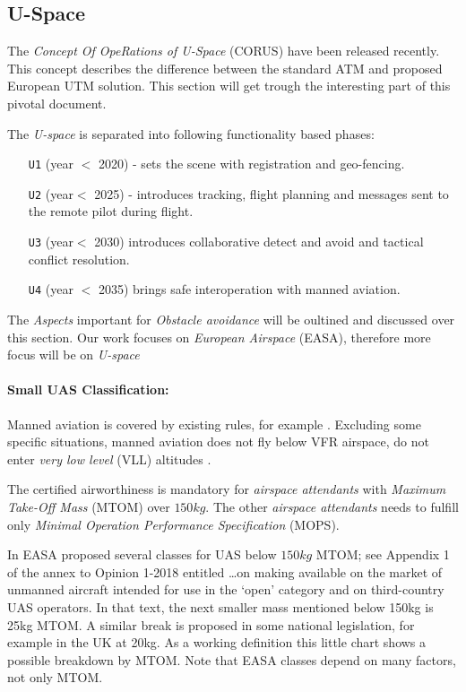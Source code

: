 \subsection{U-Space}\label{sec:USpace}

\noindent The \emph{Concept Of OpeRations of U-Space} (CORUS) \cite{corus2018} have been released recently. This concept describes the difference between the standard ATM and proposed European UTM solution. This section will get trough the interesting part of this pivotal document.

\noindent The \emph{U-space} is separated into following functionality based phases:
\begin{itemize}
    \item[\texttt{U1}] (year $<$ 2020) - sets the scene with registration and geo-fencing.
    
    \item[\texttt{U2}] (year$<$ 2025) - introduces tracking, flight planning and messages sent to the remote pilot during flight.
    
    \item[\texttt{U3}] (year$<$ 2030) introduces collaborative detect and avoid and tactical conflict resolution.
    
    \item[\texttt{U4}] (year $<$ 2035) brings safe interoperation with manned aviation.
\end{itemize}

The \emph{Aspects} important for \emph{Obstacle avoidance} will be oultined and discussed over this section. Our work focuses on \emph{European Airspace} (EASA), therefore more focus will be on \emph{U-space}

\paragraph{Small UAS Classification:} Manned aviation is covered by existing rules, for example \cite{icaoAnnex2,ec201208ref5}. Excluding some specific situations, manned aviation does not fly below VFR airspace, do not enter \emph{very low level} (VLL) altitudes \cite{ec200802ref4}. 

The certified airworthiness is mandatory for \emph{airspace attendants} with \emph{Maximum Take-Off Mass} (MTOM) over $150 kg$. The other \emph{airspace attendants} needs to fulfill only \emph{Minimal Operation Performance Specification} (MOPS). 

In \cite{easa201801op} EASA proposed several classes for UAS below $150kg$ MTOM; see Appendix 1 of the annex to
Opinion 1-2018 entitled …on making available on the market of unmanned aircraft intended for use in
the ‘open’ category and on third-country UAS operators. In that text, the next smaller mass mentioned
below 150kg is 25kg MTOM. A similar break is proposed in some national legislation, for example in
the UK at 20kg. As a working definition this little chart shows a possible breakdown by MTOM. Note
that EASA classes depend on many factors, not only MTOM.

